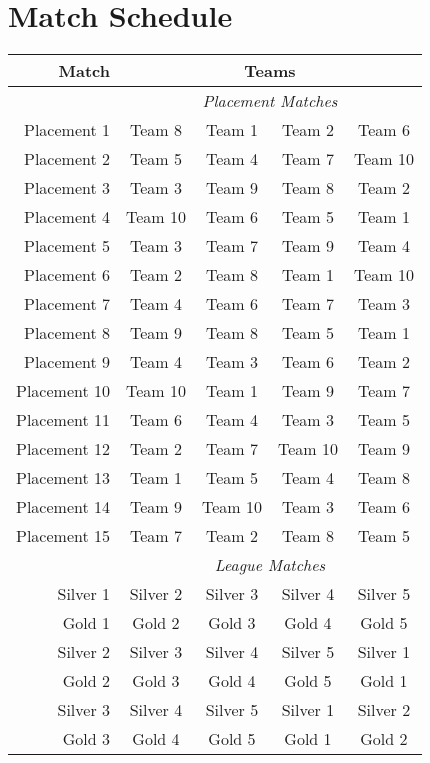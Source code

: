 \section{Match Schedule}
\label{apx:matches}

\begin{tabular}{r | c c c c}
    Match & \multicolumn{4}{|c}{Teams} \\
    \hline
    & \multicolumn{4}{|c}{\textit{Placement Matches}} \\
    Placement 1 & Team 8 & Team 1 & Team 2 & Team 6 \\
    Placement 2 & Team 5 & Team 4 & Team 7 & Team 10 \\
    Placement 3 & Team 3 & Team 9 & Team 8 & Team 2 \\
    Placement 4 & Team 10 & Team 6 & Team 5 & Team 1 \\
    Placement 5 & Team 3 & Team 7 & Team 9 & Team 4 \\
    Placement 6 & Team 2 & Team 8 & Team 1 & Team 10 \\
    Placement 7 & Team 4 & Team 6 & Team 7 & Team 3 \\
    Placement 8 & Team 9 & Team 8 & Team 5 & Team 1 \\
    Placement 9 & Team 4 & Team 3 & Team 6 & Team 2 \\
    Placement 10 & Team 10 & Team 1 & Team 9 & Team 7 \\
    Placement 11 & Team 6 & Team 4 & Team 3 & Team 5 \\
    Placement 12 & Team 2 & Team 7 & Team 10 & Team 9 \\
    Placement 13 & Team 1 & Team 5 & Team 4 & Team 8 \\
    Placement 14 & Team 9 & Team 10 & Team 3 & Team 6 \\
    Placement 15 & Team 7 & Team 2 & Team 8 & Team 5 \\
    & \multicolumn{4}{|c}{\textit{League Matches}} \\
    Silver 1 & Silver 2 & Silver 3 & Silver 4 & Silver 5 \\
    Gold 1 & Gold 2 & Gold 3 & Gold 4 & Gold 5 \\
    Silver 2 & Silver 3 & Silver 4 & Silver 5 & Silver 1 \\
    Gold 2 & Gold 3 & Gold 4 & Gold 5 & Gold 1 \\
    Silver 3 & Silver 4 & Silver 5 & Silver 1 & Silver 2 \\
    Gold 3 & Gold 4 & Gold 5 & Gold 1 & Gold 2 \\

\end{tabular}
